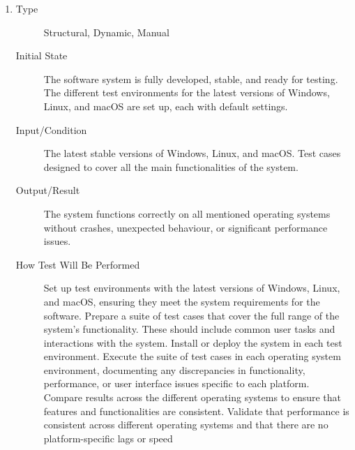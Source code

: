 \documentclass[12pt, titlepage]{article}
\begin{document}
\begin{enumerate}[NFR-T1]
\item \label{NFRT16}
  \begin{description}
  \item[Type] Structural, Dynamic, Manual
  \item[Initial State] The software system is fully developed, stable, and ready
    for testing. The different test environments for the latest versions of
    Windows, Linux, and macOS are set up, each with default settings.
  \item[Input/Condition] The latest stable versions of Windows, Linux, and
    macOS. Test cases designed to cover all the main functionalities of the
    system.
  \item[Output/Result] The system functions correctly on all mentioned operating
    systems without crashes, unexpected behaviour, or significant performance
    issues.
  \item[How Test Will Be Performed] Set up test environments with the latest
    versions of Windows, Linux, and macOS, ensuring they meet the system
    requirements for the software. Prepare a suite of test cases that cover the
    full range of the system's functionality. These should include common user
    tasks and interactions with the system. Install or deploy the system in each
    test environment. Execute the suite of test cases in each operating system
    environment, documenting any discrepancies in functionality, performance, or
    user interface issues specific to each platform. Compare results across the
    different operating systems to ensure that features and functionalities are
    consistent. Validate that performance is consistent across different
    operating systems and that there are no platform-specific lags or speed

\end{description}
\end{enumerate}
\end{document}
